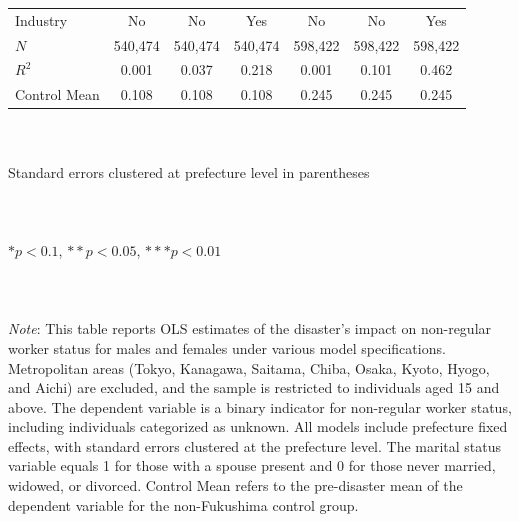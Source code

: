 \documentclass[serif, aspectratio=169]{beamer}
\begin{document}
\begin{frame}
\begin{table}[htbp]
\begin{tabular}{@{}l*{6}{c}@{}}
Industry  &       No         &       No         &      Yes         &       No         &       No         &      Yes         \\
$\textit{N}$&  540,474         &  540,474         &  540,474         &  598,422         &  598,422         &  598,422         \\
$\textit{R}^2$&    0.001         &    0.037         &    0.218         &    0.001         &    0.101         &    0.462         \\
Control Mean&    0.108         &    0.108         &    0.108         &    0.245         &    0.245         &    0.245         \\
\bottomrule
\end{tabular}
\\\\{\linewidth}{\tiny Standard errors clustered at prefecture level in parentheses}\\\\
\\\\{\linewidth}{\tiny $*p<0.1$, $**p<0.05$, $***p<0.01$}\\\\
\\\\{\linewidth}{\tiny \textit{Note}: This table reports OLS estimates of the disaster's impact on non-regular worker status for males and females under various model specifications. Metropolitan areas (Tokyo, Kanagawa, Saitama, Chiba, Osaka, Kyoto, Hyogo, and Aichi) are excluded, and the sample is restricted to individuals aged 15 and above. The dependent variable is a binary indicator for non-regular worker status, including individuals categorized as unknown. All models include prefecture fixed effects, with standard errors clustered at the prefecture level. The marital status variable equals 1 for those with a spouse present and 0 for those never married, widowed, or divorced. Control Mean refers to the pre-disaster mean of the dependent variable for the non-Fukushima control group.}
\end{table}

\end{frame}

\end{document}
